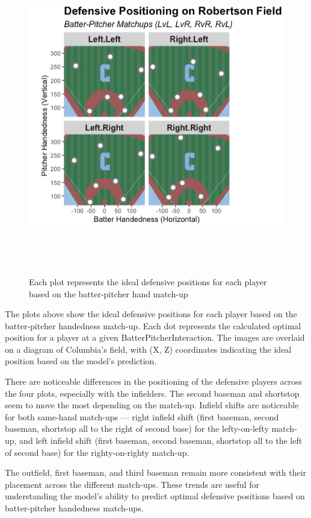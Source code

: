 \documentclass{article}
\begin{document}
\newpage
\begin{figure}[h]
    \centering
    \includegraphics[height=13cm]{images/optimal_pos.png}
    \caption{Each plot represents the ideal defensive positions for each player based on the batter-pitcher hand match-up}
    \cite{trackman2022}\cite{trackman2022}\cite{trackman2024}
\end{figure}

The plots above show the ideal defensive positions for each player based on the batter-pitcher handedness match-up. Each dot represents the calculated optimal position for a player at a given BatterPitcherInteraction. The images are overlaid on a diagram of Columbia's field, with (X, Z) coordinates indicating the ideal position based on the model’s prediction.

There are noticeable differences in the positioning of the defensive players across the four plots, especially with the infielders. The second baseman and shortstop seem to move the most depending on the match-up. Infield shifts are noticeable for both same-hand match-ups — right infield shift (first baseman, second baseman, shortstop all to the right of second base) for the lefty-on-lefty match-up, and left infield shift (first baseman, second baseman, shortstop all to the left of second base) for the righty-on-righty match-up.

The outfield, first baseman, and third baseman remain more consistent with their placement across the different match-ups. These trends are useful for understanding the model's ability to predict optimal defensive positions based on batter-pitcher handedness match-ups.
\end{document}
